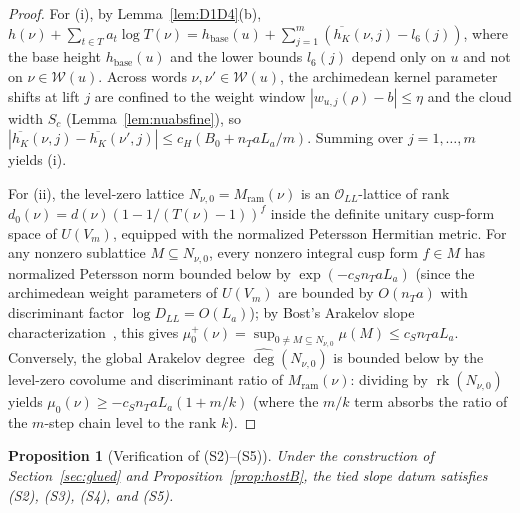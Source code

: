 \documentclass[11pt]{amsart}
\newcommand{\Oc}{\mathcal{O}}
\DeclareMathOperator{\rk}{rk}
\theoremstyle{plain}
\newtheorem{proposition}[theorem]{Proposition}
\theoremstyle{definition}
\numberwithin{equation}{section}
\begin{document}
\begin{proof}
For (i), by Lemma~\ref{lem:D1D4}(b),
$h(\nu)+\sum_{t\in T}a_t\log T(\nu)=h_{\mathrm{base}}(u)+\sum_{j=1}^m(\overline{h_K}(\nu,j)-l_6(j))$,
where the base height $h_{\mathrm{base}}(u)$ and the lower bounds $l_6(j)$ depend only on $u$ and
not on $\nu\in\mathcal W(u)$. Across words $\nu,\nu'\in\mathcal W(u)$, the archimedean kernel
parameter shifts at lift $j$ are confined to the weight window $|w_{u,j}(\rho)-b|\le\eta$ and the
cloud width $S_c$ (Lemma~\ref{lem:nuabsfine}), so
$|\overline{h_K}(\nu,j)-\overline{h_K}(\nu',j)|\le c_H(B_0+n_T a L_a/m)$. Summing over
$j=1,\dots,m$ yields (i).

For (ii), the level-zero lattice $N_{\nu,0}=M_{\mathrm{ram}}(\nu)$ is an $\Oc_{LL}$-lattice of
rank $d_0(\nu)=d(\nu)(1-1/(T(\nu)-1))^f$ inside the definite unitary cusp-form space of $U(V_m)$,
equipped with the normalized Petersson Hermitian metric. For any nonzero sublattice
$M\subseteq N_{\nu,0}$, every nonzero integral cusp form $f\in M$ has normalized Petersson norm
bounded below by $\exp(-c_S n_T a L_a)$ (since the archimedean weight parameters of $U(V_m)$ are
bounded by $O(n_T a)$ with discriminant factor $\log D_{LL}=O(L_a)$); by Bost's Arakelov slope
characterization~\cite[\S4.1, Prop.~4.1.2]{bost-arakelov}, this gives
$\mu_0^+(\nu)=\sup_{0\neq M\subseteq N_{\nu,0}}\mu(M)\le c_S n_T a L_a$. Conversely, the global
Arakelov degree $\widehat\deg(N_{\nu,0})$ is bounded below by the level-zero covolume and
discriminant ratio of $M_{\mathrm{ram}}(\nu)$: dividing by $\rk(N_{\nu,0})$ yields
$\mu_0(\nu)\ge -c_S n_T a L_a(1+m/k)$ (where the $m/k$ term absorbs the ratio of the $m$-step
chain level to the rank $k$).
\end{proof}

\begin{proposition}[Verification of (S2)--(S5)]\label{prop:S2S5}
Under the construction of Section~\ref{sec:glued} and Proposition~\ref{prop:hostB}, the tied slope
datum satisfies \textup{(S2)}, \textup{(S3)}, \textup{(S4)}, and \textup{(S5)}.
\end{proposition}
\end{document}
